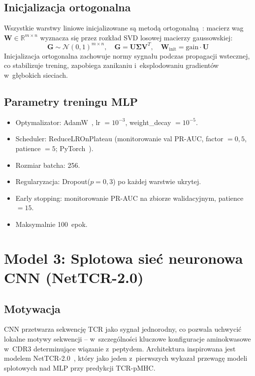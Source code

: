 \documentclass{SGGW-thesis}
\begin{document}
\subsection{Inicjalizacja ortogonalna}

Wszystkie warstwy liniowe inicjalizowane są metodą ortogonalną~\cite{saxe2014}: macierz wag
$\mathbf{W} \in \mathbb{R}^{m \times n}$ wyznacza się przez rozkład SVD losowej macierzy gaussowskiej:
\begin{equation}
    \mathbf{G} \sim \mathcal{N}(0,1)^{m \times n}, \quad \mathbf{G} = \mathbf{U}\boldsymbol{\Sigma}\mathbf{V}^T, \quad \mathbf{W}_{\mathrm{init}} = \mathrm{gain} \cdot \mathbf{U}
    \label{eq:ortho_init}
\end{equation}
Inicjalizacja ortogonalna zachowuje normy sygnału podczas propagacji wstecznej, co stabilizuje
trening, zapobiega zanikaniu i~eksplodowaniu gradientów w~głębokich sieciach.

\subsection{Parametry treningu MLP}

\begin{itemize}
  \item Optymalizator: AdamW~\cite{loshchilov2019}, lr $= 10^{-3}$, weight\_decay $= 10^{-5}$.
  \item Scheduler: ReduceLROnPlateau (monitorowanie val PR-AUC, factor $= 0{,}5$, patience $= 5$; PyTorch~\cite{paszke2019}).
  \item Rozmiar batcha: 256.
  \item Regularyzacja: Dropout($p=0{,}3$) po każdej warstwie ukrytej.
  \item Early stopping: monitorowanie PR-AUC na zbiorze walidacyjnym, patience $= 15$.
  \item Maksymalnie 100~epok.
\end{itemize}

\section{Model 3: Splotowa sieć neuronowa CNN (NetTCR-2.0)}

\subsection{Motywacja}

CNN przetwarza sekwencję TCR jako sygnał jednorodny, co pozwala uchwycić lokalne motywy sekwencji
-- w~szczególności kluczowe konfiguracje aminokwasowe w~CDR3 determinujące wiązanie z~peptydem.
Architektura inspirowana jest modelem NetTCR-2.0~\cite{montemurro2022}, który jako jeden z~pierwszych
wykazał przewagę modeli splotowych nad MLP przy predykcji TCR-pMHC.
\end{document}
